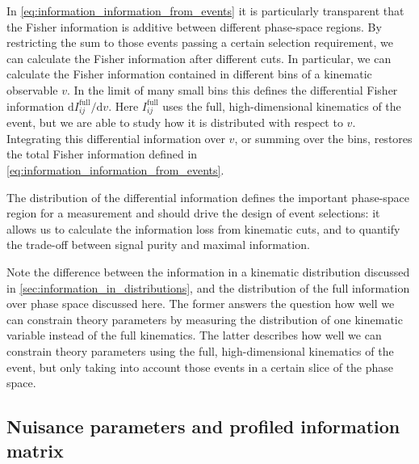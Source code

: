 In \autoref{eq:information_information_from_events} it is particularly
transparent that the Fisher information is additive between different
phase-space regions.  By restricting the sum to those events passing a
certain selection requirement, we can calculate the Fisher information
after different cuts. In particular, we can calculate the Fisher
information contained in different bins of a kinematic observable
$v$. In the limit of many small bins this defines the differential
Fisher information $\mathrm{d} I_{ij}^{\text{full}} / \mathrm{d} v$.
Here $I_{ij}^{\text{full}}$ uses the full, high-dimensional kinematics
of the event, but we are able to study how it is distributed with
respect to $v$. Integrating this differential information over $v$, or
summing over the bins, restores the total Fisher information defined
in \autoref{eq:information_information_from_events}.

The distribution of the differential information defines the important
phase-space region for a measurement and should drive the design of
event selections: it allows us to calculate the information loss from
kinematic cuts, and to quantify the trade-off between signal purity
and maximal information.

Note the difference between the information in a kinematic
distribution discussed in \autoref{sec:information_in_distributions},
and the distribution of the full information over phase space
discussed here. The former answers the question how well we can
constrain theory parameters by measuring the distribution of one
kinematic variable instead of the full kinematics. The latter
describes how well we can constrain theory parameters using the full,
high-dimensional kinematics of the event, but only taking into account
those events in a certain slice of the phase space.



\subsection{Nuisance parameters and profiled information matrix}
\label{sec:information_nuisance}

